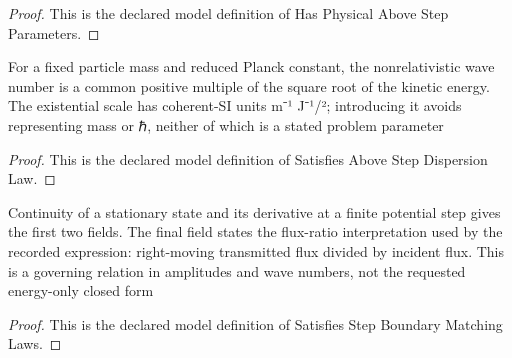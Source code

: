 \begin{proof}
  This is the declared model definition of Has Physical Above Step Parameters.
\end{proof}
\begin{definition}
  \label{def:physics:phyx-mini-0544:phyxminiproblems-problemphyxmini0544-satisfiesabovestepdispersionlaw}
  For a fixed particle mass and reduced Planck constant, the nonrelativistic wave number is a common positive multiple of the square root of the kinetic energy. The existential scale has coherent-SI units m⁻¹ J⁻¹/²; introducing it avoids representing mass or ℏ, neither of which is a stated problem parameter
\end{definition}
\begin{proof}
  This is the declared model definition of Satisfies Above Step Dispersion Law.
\end{proof}
\begin{definition}
  \label{def:physics:phyx-mini-0544:phyxminiproblems-problemphyxmini0544-satisfiesstepboundarymatchinglaws}
  Continuity of a stationary state and its derivative at a finite potential step gives the first two fields. The final field states the flux-ratio interpretation used by the recorded expression: right-moving transmitted flux divided by incident flux. This is a governing relation in amplitudes and wave numbers, not the requested energy-only closed form
\end{definition}
\begin{proof}
  This is the declared model definition of Satisfies Step Boundary Matching Laws.
\end{proof}
